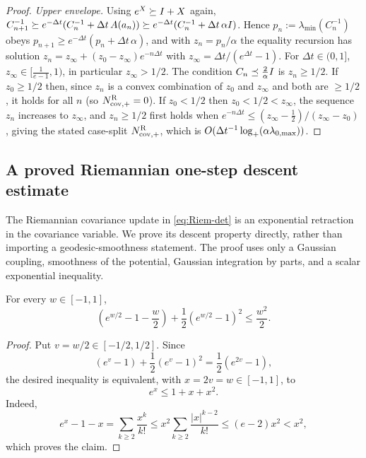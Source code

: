 \begin{proof}
\emph{Upper envelope.} Using $e^X\succeq I+X$ again,
$C_{n+1}^{-1}\succeq e^{-\Delta t}(C_n^{-1}+\Delta t\,A(a_n))\succeq e^{-\Delta t}(C_n^{-1}+\Delta t\,\alpha I)$.
Hence $p_n:=\lambda_{\min}(C_n^{-1})$ obeys $p_{n+1}\geq e^{-\Delta t}(p_n+\Delta t\,\alpha)$, and with
$z_n=p_n/\alpha$ the equality recursion has solution
$z_n=z_\infty+(z_0-z_\infty)e^{-n\Delta t}$ with $z_\infty=\Delta t/(e^{\Delta t}-1)$. For
$\Delta t\in(0,1]$, $z_\infty\in[\tfrac1{e-1},1)$, in particular $z_\infty>1/2$. The
condition $C_n\preceq\tfrac2\alpha I$ is $z_n\geq1/2$. If $z_0\geq1/2$ then, since $z_n$ is
a convex combination of $z_0$ and $z_\infty$ and both are $\geq1/2$, it holds for all $n$
(so $N_{\mathrm{cov},+}^{\mathrm{R}}=0$). If $z_0<1/2$ then $z_0<1/2<z_\infty$, the sequence $z_n$
increases to $z_\infty$, and $z_n\geq1/2$ first holds when
$e^{-n\Delta t}\leq(z_\infty-\tfrac12)/(z_\infty-z_0)$, giving the stated case-split
$N_{\mathrm{cov},+}^{\mathrm{R}}$, which is $O(\Delta t^{-1}\log_+(\alpha\lambda_{0,\max}))$.
\end{proof}


\subsection{A proved Riemannian one-step descent estimate}
\label{subsec:Riem-descent}

The Riemannian covariance update in \eqref{eq:Riem-det} is an exponential retraction in the
covariance variable.  We prove its descent property directly, rather than importing a
geodesic-smoothness statement.  The proof uses only a Gaussian coupling, smoothness of the
potential, Gaussian integration by parts, and a scalar exponential inequality.

\begin{lemma}
\label{lem:scalar-retraction}
For every $w\in[-1,1]$,
\[
    \left(e^{w/2}-1-\frac w2\right)
    +\frac12\left(e^{w/2}-1\right)^2
    \leq \frac{w^2}{2}.
\]
\end{lemma}

\begin{proof}
Put $v=w/2\in[-1/2,1/2]$.  Since
\[
    (e^v-1)+\frac12(e^v-1)^2=\frac12(e^{2v}-1),
\]
the desired inequality is equivalent, with $x=2v=w\in[-1,1]$, to
\[
    e^x\leq 1+x+x^2.
\]
Indeed,
\[
    e^x-1-x
    =\sum_{k\geq2}\frac{x^k}{k!}
    \leq x^2\sum_{k\geq2}\frac{|x|^{k-2}}{k!}
    \leq (e-2)x^2<x^2,
\]
which proves the claim.
\end{proof}

